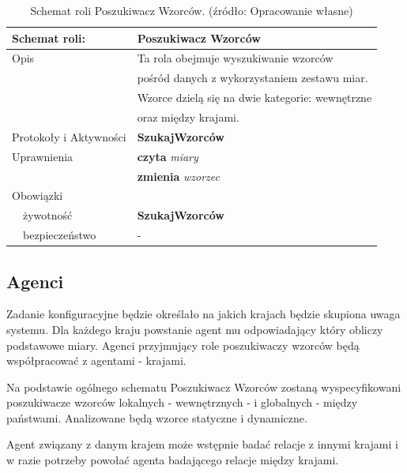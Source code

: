 \documentclass[11pt]{report}
\begin{document}
    \begin{table}[ht!]
        \begin{tabular}{ll}
            Schemat roli:          & Poszukiwacz Wzorców                             \\ \hline
            Opis                   & Ta rola obejmuje wyszukiwanie wzorców           \\
            & pośród danych z wykorzystaniem zestawu miar.    \\
            & Wzorce dzielą się na dwie kategorie: wewnętrzne \\
            & oraz między krajami.                            \\
            Protokoły i Aktywności & \textbf{SzukajWzorców}                          \\
            Uprawnienia            & \textbf{czyta} \textit{miary}                   \\
            & \textbf{zmienia} \textit{wzorzec}               \\
            Obowiązki              &                                                 \\
            ~~żywotność            & \textbf{SzukajWzorców}                          \\
            ~~bezpieczeństwo       & -                                               \\
        \end{tabular}
        \caption{Schemat roli Poszukiwacz Wzorców. (źródło: Opracowanie własne)}
        \label{tab:schemat roli Poszukiwacz Wzorców}
    \end{table}

    \subsection{Agenci}
    Zadanie konfiguracyjne będzie określało na jakich krajach będzie skupiona uwaga systemu.
    Dla każdego kraju powstanie agent mu odpowiadający który obliczy podstawowe miary.
    Agenci przyjmujący role poszukiwaczy wzorców będą współpracować z agentami - krajami.

    Na podstawie ogólnego schematu Poszukiwacz Wzorców zostaną wyspecyfikowani poszukiwacze wzorców lokalnych - wewnętrznych -
    i globalnych - między państwami.
    Analizowane będą wzorce statyczne i dynamiczne.

    Agent związany z danym krajem może wstępnie badać relacje z innymi krajami i w razie potrzeby powołać agenta badającego relacje między krajami.
\end{document}
